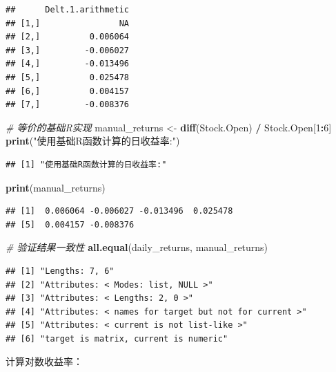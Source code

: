 \documentclass[]{ctexbook}
\newenvironment{Shaded}{\begin{snugshade}}{\end{snugshade}}
\newcommand{\CommentTok}[1]{\textcolor[rgb]{0.56,0.35,0.01}{\textit{#1}}}
\newcommand{\DecValTok}[1]{\textcolor[rgb]{0.00,0.00,0.81}{#1}}
\newcommand{\FunctionTok}[1]{\textcolor[rgb]{0.13,0.29,0.53}{\textbf{#1}}}
\newcommand{\NormalTok}[1]{#1}
\newcommand{\OtherTok}[1]{\textcolor[rgb]{0.56,0.35,0.01}{#1}}
\newcommand{\SpecialCharTok}[1]{\textcolor[rgb]{0.81,0.36,0.00}{\textbf{#1}}}
\newcommand{\StringTok}[1]{\textcolor[rgb]{0.31,0.60,0.02}{#1}}
\begin{document}
\begin{verbatim}
##      Delt.1.arithmetic
## [1,]                NA
## [2,]          0.006064
## [3,]         -0.006027
## [4,]         -0.013496
## [5,]          0.025478
## [6,]          0.004157
## [7,]         -0.008376
\end{verbatim}

\begin{Shaded}
\begin{Highlighting}[]
\CommentTok{\# 等价的基础R实现}
\NormalTok{manual\_returns }\OtherTok{\textless{}{-}} \FunctionTok{diff}\NormalTok{(Stock.Open) }\SpecialCharTok{/}\NormalTok{ Stock.Open[}\DecValTok{1}\SpecialCharTok{:}\DecValTok{6}\NormalTok{]}
\FunctionTok{print}\NormalTok{(}\StringTok{"使用基础R函数计算的日收益率:"}\NormalTok{)}
\end{Highlighting}
\end{Shaded}

\begin{verbatim}
## [1] "使用基础R函数计算的日收益率:"
\end{verbatim}

\begin{Shaded}
\begin{Highlighting}[]
\FunctionTok{print}\NormalTok{(manual\_returns)}
\end{Highlighting}
\end{Shaded}

\begin{verbatim}
## [1]  0.006064 -0.006027 -0.013496  0.025478
## [5]  0.004157 -0.008376
\end{verbatim}

\begin{Shaded}
\begin{Highlighting}[]
\CommentTok{\# 验证结果一致性}
\FunctionTok{all.equal}\NormalTok{(daily\_returns, manual\_returns)}
\end{Highlighting}
\end{Shaded}

\begin{verbatim}
## [1] "Lengths: 7, 6"                                       
## [2] "Attributes: < Modes: list, NULL >"                   
## [3] "Attributes: < Lengths: 2, 0 >"                       
## [4] "Attributes: < names for target but not for current >"
## [5] "Attributes: < current is not list-like >"            
## [6] "target is matrix, current is numeric"
\end{verbatim}

计算对数收益率：
\end{document}
